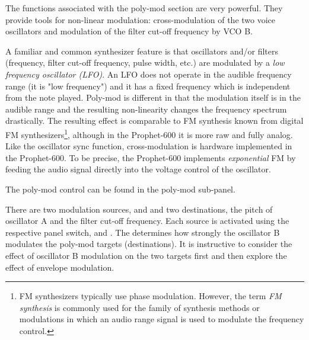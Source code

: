 The functions associated with the poly-mod section are very powerful. They provide tools for non-linear modulation: cross-modulation of the two voice oscillators and modulation of the filter cut-off frequency by VCO B. 

A familiar and common synthesizer feature is that oscillators and/or filters (frequency, filter cut-off frequency, pulse width, etc.) are modulated by a \textit{low frequency oscillator (LFO)}. An LFO does not operate in the audible frequency range (it is "low frequency") and it has a fixed frequency which is independent from the note played. Poly-mod is different in that the modulation itself is in the audible range and the resulting non-linearity changes the frequency spectrum drastically. The resulting effect is comparable to FM synthesis known from digital FM synthesizers\footnote{FM synthesizers typically use phase modulation. However, the term \textit{FM synthesis} is commonly used for the family of synthesis methods or modulations in which an audio range signal is used to modulate the frequency control.}, although in the Prophet-600 it is more raw and fully analog. Like the oscillator sync function, cross-modulation is hardware implemented in the Prophet-600. To be precise, the Prophet-600 implements \textit{exponential} FM by feeding the audio signal directly into the voltage control of the oscillator.

The poly-mod control can be found in the poly-mod sub-panel. 

\begin{center}
\end{center}

There are two modulation sources, \polymodenv and \polymodosc and two destinations, the pitch of oscillator A  and the filter cut-off frequency. Each source is activated using the respective panel switch, \polymodfreq and \polymodfilter. The \polymodosc determines how strongly the oscillator B modulates the poly-mod targets (destinations). It is instructive to consider the effect of oscillator B modulation on the two targets first and then explore the effect of envelope modulation.


